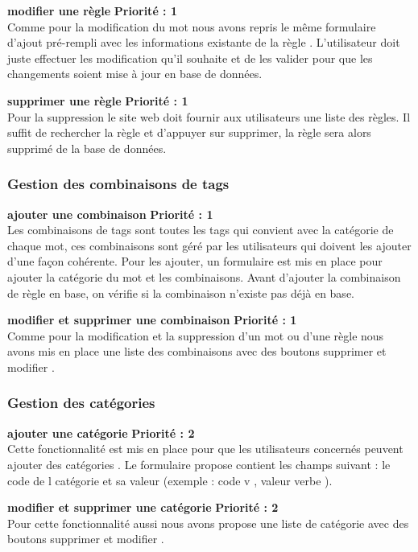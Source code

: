 \documentclass[12pt,a4paper]{article}
\begin{document}
\textbf{modifier une règle } \textbf{Priorité : 1} \\ Comme pour la modification du mot nous avons repris le même formulaire d'ajout pré-rempli avec les informations existante de la règle . L'utilisateur doit juste effectuer les modification qu'il souhaite et de les valider pour que les changements soient mise à jour  en base de données.


\textbf{supprimer une règle } \textbf{Priorité : 1} \\ Pour la suppression le site web doit fournir aux utilisateurs une liste des règles. Il suffit de rechercher la règle et d'appuyer sur supprimer, la règle  sera alors supprimé de la base de données.

\subsubsection{Gestion des combinaisons de tags }
\textbf{ajouter une combinaison } \textbf{Priorité : 1} \\ Les combinaisons de tags  sont  toutes les tags qui convient avec la catégorie de chaque mot, ces combinaisons sont géré par les utilisateurs qui doivent les ajouter d'une façon cohérente.
Pour les ajouter, un formulaire est mis en place pour ajouter la catégorie du mot et les combinaisons. Avant d'ajouter la combinaison de règle en base, on vérifie si la combinaison n'existe pas déjà en base.

\textbf{modifier et supprimer une combinaison } \textbf{Priorité : 1} \\ Comme pour la modification et la suppression d'un mot ou d'une règle nous avons mis en place une liste des combinaisons avec des boutons supprimer et modifier .

 
\subsubsection{Gestion des catégories }
\textbf{ajouter une catégorie } \textbf{Priorité : 2}\\ Cette fonctionnalité  est mis en place pour que les utilisateurs concernés peuvent ajouter des catégories . Le formulaire propose contient les champs suivant : le code de l catégorie et sa valeur (exemple : code v , valeur verbe ).

\textbf{modifier et supprimer  une catégorie } \textbf{Priorité : 2}\\ Pour cette fonctionnalité aussi nous avons propose une liste de catégorie avec des boutons supprimer et modifier .
\end{document}
